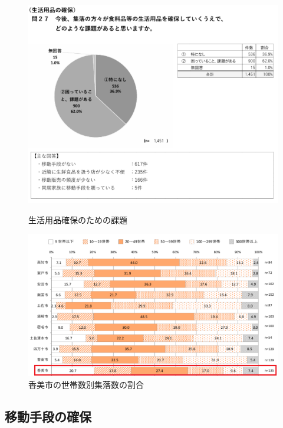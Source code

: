 \begin{figure}[h]
  \centering
  \begin{minipage}{0.43\columnwidth}
    \centering
    \includegraphics[width=\columnwidth]{get_food_graph.pdf}
    \caption{生活用品確保のための課題}
    \label{fig:get_food}
  \end{minipage}
  \hspace{5mm}
  \begin{minipage}{0.43\columnwidth}
    \centering
    \includegraphics[width=\columnwidth]{市町村別世帯数別集落数の割合.pdf}
    \caption{香美市の世帯数別集落数の割合}
    \label{fig:市町村別世帯数別集落数の割合}
  \end{minipage}
\end{figure}

\subsection{移動手段の確保}

